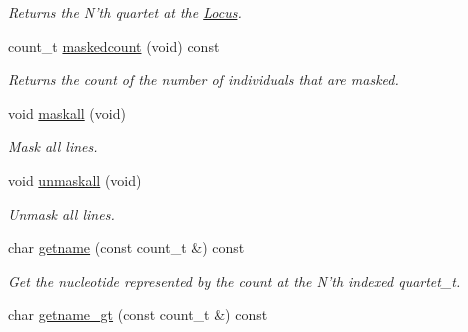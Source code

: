\begin{DoxyCompactItemize}
\begin{DoxyCompactList}\small\item\em Returns the N'th quartet at the \hyperlink{classLocus}{Locus}. \end{DoxyCompactList}\item 
\hypertarget{classLocus_a461ea95607c6e7d647cbd2f4eeeba298}{count\-\_\-t \hyperlink{classLocus_a461ea95607c6e7d647cbd2f4eeeba298}{maskedcount} (void) const }\label{classLocus_a461ea95607c6e7d647cbd2f4eeeba298}

\begin{DoxyCompactList}\small\item\em Returns the count of the number of individuals that are masked. \end{DoxyCompactList}\item 
\hypertarget{classLocus_a2a93a9620b9888fe0e98824292fde309}{void \hyperlink{classLocus_a2a93a9620b9888fe0e98824292fde309}{maskall} (void)}\label{classLocus_a2a93a9620b9888fe0e98824292fde309}

\begin{DoxyCompactList}\small\item\em Mask all lines. \end{DoxyCompactList}\item 
\hypertarget{classLocus_a0dd16837f27a639becbd30d50e7f8165}{void \hyperlink{classLocus_a0dd16837f27a639becbd30d50e7f8165}{unmaskall} (void)}\label{classLocus_a0dd16837f27a639becbd30d50e7f8165}

\begin{DoxyCompactList}\small\item\em Unmask all lines. \end{DoxyCompactList}\item 
\hypertarget{classLocus_a8f524607e970e919b1a57d019fd96b14}{char \hyperlink{classLocus_a8f524607e970e919b1a57d019fd96b14}{getname} (const count\-\_\-t \&) const }\label{classLocus_a8f524607e970e919b1a57d019fd96b14}

\begin{DoxyCompactList}\small\item\em Get the nucleotide represented by the count at the N'th indexed quartet\-\_\-t. \end{DoxyCompactList}\item 
\hypertarget{classLocus_a76abc341c0e718ebf91258ffc51e9a4f}{char \hyperlink{classLocus_a76abc341c0e718ebf91258ffc51e9a4f}{getname\-\_\-gt} (const count\-\_\-t \&) const }\label{classLocus_a76abc341c0e718ebf91258ffc51e9a4f}


\end{DoxyCompactItemize}

